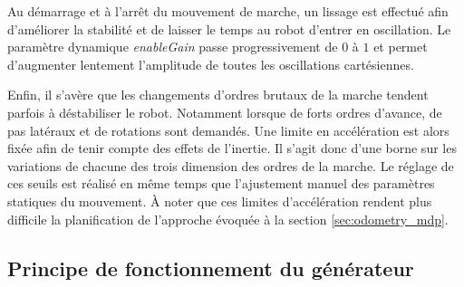 Au démarrage et à l'arrêt du mouvement de marche, un lissage
est effectué afin d'améliorer la stabilité et de laisser le temps
au robot d'entrer en oscillation.
Le paramètre dynamique \textit{enableGain} passe progressivement de
$0$ à $1$ et permet d'augmenter lentement l'amplitude
de toutes les oscillations cartésiennes.

Enfin, il s'avère que les changements d'ordres brutaux de la marche
tendent parfois à déstabiliser le robot.
Notamment lorsque de forts ordres d'avance, de pas latéraux 
et de rotations sont demandés.
Une limite en accélération est alors fixée afin de tenir compte
des effets de l'inertie.
Il s'agit donc d'une borne sur les variations de chacune 
des trois dimension des ordres de la marche.
Le réglage de ces seuils est réalisé en même temps que l'ajustement
manuel des paramètres statiques du mouvement.
À noter que ces limites d'accélération rendent plus difficile
la planification de l'approche évoquée à la section \ref{sec:odometry_mdp}.

\subsection{Principe de fonctionnement du générateur}

